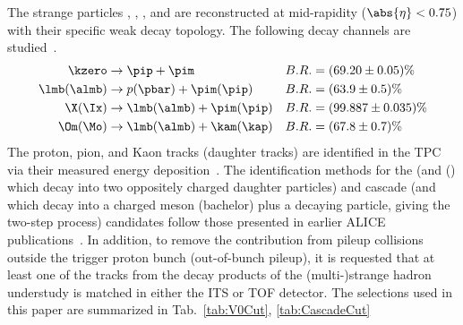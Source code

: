 \documentclass[ALICE,manyauthors]{cernphprep}
\begin{document}
The strange particles \kzero, \lmb, \almb, \Xis and \Oms are reconstructed at mid-rapidity ($\abs{\eta} < 0.75$) with their specific weak decay topology.
The following decay channels are studied~\cite{PhysRevD.98.030001}.
$$
\begin{aligned}
\kzero      & \to \pip + \pim               & B.R. & = (69.20 \pm 0.05) \% \\
\lmb (\almb) & \to p(\pbar) + \pim (\pip)    & B.R. & = (63.9  \pm 0.5)  \% \\
\X (\Ix)    & \to \lmb (\almb) + \pim (\pip) & B.R. & = (99.887 \pm 0.035) \% \\
\Om (\Mo)   & \to \lmb (\almb) + \kam (\kap) & B.R. & = (67.8  \pm 0.7)  \% \\
\end{aligned}
$$
The proton, pion, and Kaon tracks (daughter tracks) are identified in the TPC via their measured energy deposition~\cite{Abelev:2014ffa}.
The identification methods for the \Vzero (\kzero and \lmb (\almb) which decay into two oppositely charged daughter particles) and cascade (\Xis and \Oms which decay into a charged meson (bachelor) plus a \Vzero decaying particle, giving the two-step process) candidates follow those presented in earlier ALICE publications~\cite{Aamodt:2011zza, Abelev:2012jp, Acharya:2018orn, Abelev:2013haa, Acharya:2020uxl, Acharya:2019kyh}.
In addition, to remove the contribution from pileup collisions outside the trigger proton bunch (out-of-bunch pileup), it is requested that at least one of the tracks from the decay products of the (multi-)strange hadron understudy is matched in either the ITS or TOF detector.
The selections used in this paper are summarized in Tab.~\ref{tab:V0Cut}, \ref{tab:CascadeCut}
\end{document}
